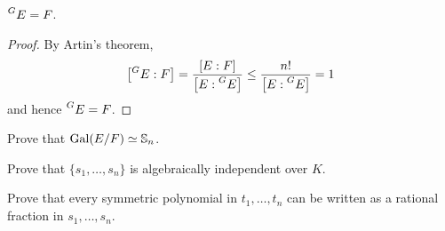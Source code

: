 \begin{theorem}
    $\prescript{G}{}{E}=F$.
\end{theorem}

\begin{proof}
    By Artin's theorem,
    \[
    \left[\prescript{G}{}{E}:F\right]=\frac{[E:F]}{\left[E:\prescript{G}{}{E}\right]}
    \leq\frac{n!}{\left[E:\prescript{G}{}{E}\right]}=1
    \]
    and hence $\prescript{G}{}{E}=F$.
\end{proof}

\begin{exercise}
    Prove that $\operatorname{Gal}(E/F)\simeq\mathbb{S}_n$.
\end{exercise}

\begin{exercise}
    Prove that $\{s_1,\dots,s_n\}$ is algebraically independent over $K$. 
\end{exercise}

\begin{exercise}
    Prove that every symmetric polynomial in $t_1,\dots,t_n$ can be written as a rational
    fraction in $s_1,\dots,s_n$. 
\end{exercise}

